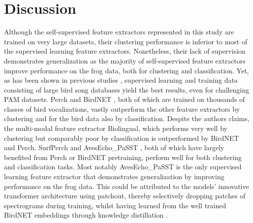 \section{Discussion}
\label{sec:discussion}

Although the self-supervised feature extractors represented in this study are trained on very large datasets, their clustering performance is inferior to most of the supervised learning feature extractors.
Nonetheless, their lack of supervision demonstrates generalization as the majority of self-supervised feature extractors improve performance on the frog data, both for clustering and classification.
Yet, as has been shown in previous studies \cite{ghani_global_2023}, supervised learning and training data consisting of large bird song databases yield the best results, even for challenging PAM datasets.
Perch and BirdNET \cite{kahl_birdnet_2021}, both of which are trained on thousands of classes of bird vocalizations, vastly outperform the other feature extractors by clustering and for the bird data also by classification. 
Despite the authors claims, the multi-modal feature extractor Biolingual, which performs very well by clustering but comparably poor by classification is outperformed by BirdNET and Perch.
SurfPerch \cite{williams_leveraging_2024} and AvesEcho\_PaSST \cite{ghani_generalization_2024}, both of which have largely benefited from Perch or BirdNET pretraining, perform well for both clustering and classification tasks.
Most notably AvesEcho\_PaSST is the only supervised learning feature extractor that demonstrates generalization by improving performance on the frog data.
This could be attributed to the models' innovative transformer architecture using patchout, thereby selectively dropping patches of spectrograms during training, whilst having learned from the well trained BirdNET embeddings through knowledge distillation \cite{ghani_generalization_2024}.


